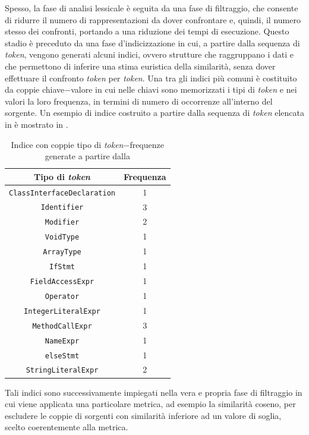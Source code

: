 Spesso, la fase di analisi lessicale è seguita da una fase di filtraggio, che consente di ridurre il numero di rappresentazioni da dover confrontare e, quindi, il numero stesso dei confronti, portando a una riduzione dei tempi di esecuzione.
%
Questo stadio è preceduto da una fase d'indicizzazione in cui, a partire dalla sequenza di \textit{token}, vengono generati alcuni indici, ovvero strutture che raggruppano i dati e che permettono di inferire una stima euristica della similarità, senza dover effettuare il confronto \textit{token} per \textit{token}.
%
Una tra gli indici più comuni è costituito da coppie chiave$-$valore in cui nelle chiavi sono memorizzati i tipi di \textit{token} e nei valori la loro frequenza, in termini di numero di occorrenze all'interno del sorgente.
%
Un esempio di indice costruito a partire dalla sequenza di \textit{token} elencata in  è mostrato in .
%
\begin{table}[h!]
    \centering
    \begin{tabular}{|c|c|} 
        \hline
        \textbf{Tipo di \textit{token}} & \textbf{Frequenza} \\ [0.5ex] 
        \hline\hline
        \texttt{ClassInterfaceDeclaration}  & 1 \\ \hline
        \texttt{Identifier}                 & 3 \\ \hline
        \texttt{Modifier}                   & 2 \\ \hline
        \texttt{VoidType}                   & 1 \\ \hline
        \texttt{ArrayType}                  & 1 \\ \hline
        \texttt{IfStmt}                     & 1 \\ \hline
        \texttt{FieldAccessExpr}            & 1 \\ \hline
        \texttt{Operator}                   & 1 \\ \hline
        \texttt{IntegerLiteralExpr}         & 1 \\ \hline
        \texttt{MethodCallExpr}             & 3 \\ \hline
        \texttt{NameExpr}                   & 1 \\ \hline
        \texttt{elseStmt}                   & 1 \\ \hline
        \texttt{StringLiteralExpr}          & 2 \\ \hline
    \end{tabular}
    \caption{Indice con coppie tipo di \textit{token}$-$frequenze generate a partire dalla }
    \label{table:token-indexing}
\end{table}
%
Tali indici sono successivamente impiegati nella vera e propria fase di filtraggio in cui viene applicata una particolare metrica, ad esempio la similarità coseno, per escludere le coppie di sorgenti con similarità inferiore ad un valore di soglia, scelto coerentemente alla metrica.

